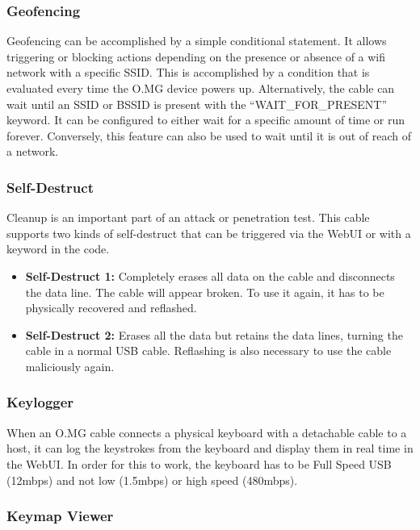 \subsubsection{Geofencing}

Geofencing can be accomplished by a simple conditional statement. It allows triggering or blocking actions depending on the presence or absence of a wifi network with a specific SSID. This is accomplished by a condition that is evaluated every time the O.MG device powers up. Alternatively, the cable can wait until an SSID or BSSID is present with the ``WAIT\_FOR\_PRESENT'' keyword.
It can be configured to either wait for a specific amount of time or run forever. Conversely, this feature can also be used to wait until it is out of reach of a network.

\subsubsection{Self-Destruct}

Cleanup is an important part of an attack or penetration test. This cable supports two kinds of self-destruct that can be triggered via the WebUI or with a keyword in the code.
\begin{itemize}
    \item  \textbf{Self-Destruct 1:} Completely erases all data on the cable and disconnects the data line. The cable will appear broken. To use it again, it has to be physically recovered and reflashed.  
    \item  \textbf{Self-Destruct 2:}  Erases all the data but retains the data lines, turning the cable in a normal USB cable. Reflashing is also necessary to use the cable maliciously again. 
\end{itemize}


\subsubsection{Keylogger}

When an O.MG cable connects a physical keyboard with a detachable cable to a host, it can log the keystrokes from the keyboard and display them in real time in the WebUI. In order for this to work, the keyboard has to be Full Speed USB (12mbps) and not low (1.5mbps) or high speed (480mbps). 

\subsubsection{Keymap Viewer}

